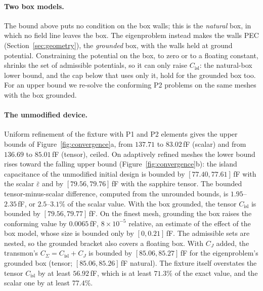 \documentclass{anvil-paper}
\newcommand{\Cisl}{C_{\mathrm{isl}}}
\begin{document}
\paragraph{Two box models.}
The bound above puts no condition on the box walls; this is the
\emph{natural} box, in which no field line leaves the box. The
eigenproblem instead makes the walls PEC (Section~\ref{sec:geometry}),
the \emph{grounded} box, with the walls held at ground potential.
Constraining the potential on the box,
to zero or to a floating constant, shrinks the set of admissible
potentials, so it can only raise $\Cisl$: the natural-box lower bound, and
the cap below that uses only it, hold for the grounded box too. For an upper
bound we re-solve the conforming P2 problems on the same meshes with the
box grounded.

\paragraph{The unmodified device.}
Uniform refinement of the fixture with P1 and P2 elements gives the upper
bounds of Figure~\ref{fig:convergence}a, from $137.71$ to $83.02$\,fF
(scalar) and from $136.69$ to $85.01$\,fF (tensor), ceiled. On adaptively
refined meshes the lower bound rises toward the falling upper bound
(Figure~\ref{fig:convergence}b): the island capacitance of the unmodified
initial design is bounded by $[77.40, 77.61]$\,fF with the scalar
$\bar\varepsilon$ and by $[79.56, 79.76]$\,fF with the sapphire tensor.
The bounded tensor-minus-scalar
difference, computed from the unrounded bounds, is $1.95$--$2.35$\,fF, or
$2.5$--$3.1\%$ of the scalar value. With the box grounded, the tensor
$\Cisl$ is bounded by $[79.56, 79.77]$\,fF. On the finest mesh, grounding
the box raises the conforming value by $0.0065$\,fF, $8\times10^{-5}$
relative, an estimate of the effect of the box model, whose size is
bounded only by $[0, 0.21]$\,fF. The admissible sets are nested, so the
grounded bracket also covers a floating box. With $C_J$ added, the transmon's
$C_\Sigma = \Cisl + C_J$ is bounded by $[85.06, 85.27]$\,fF for the
eigenproblem's grounded box (tensor; $[85.06, 85.26]$\,fF natural). The
fixture itself overstates the tensor $\Cisl$ by at least $56.92$\,fF, which is at least $71.3\%$ of
the exact value, and the scalar one by at least $77.4\%$.
\end{document}
